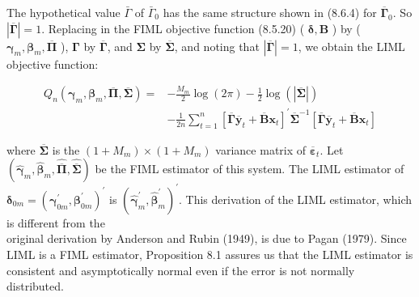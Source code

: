 \documentclass[10pt]{article}
\begin{document}
The hypothetical value $\bar{\Gamma}$ of $\bar{\Gamma}_{0}$ has the same structure shown in (8.6.4) for $\overline{\boldsymbol{\Gamma}}_{0}$. So $|\overline{\boldsymbol{\Gamma}}|=1$. Replacing in the FIML objective function (8.5.20) ( $\boldsymbol{\delta}, \mathbf{B}$ ) by ( $\boldsymbol{\gamma}_{m}, \boldsymbol{\beta}_{m}, \overline{\boldsymbol{\Pi}}$ ), $\boldsymbol{\Gamma}$ by $\overline{\boldsymbol{\Gamma}}$, and $\boldsymbol{\Sigma}$ by $\overline{\boldsymbol{\Sigma}}$, and noting that $|\overline{\boldsymbol{\Gamma}}|=1$, we obtain the LIML objective function:


\begin{align*}
Q_{n}\left(\boldsymbol{\gamma}_{m}, \boldsymbol{\beta}_{m}, \overline{\boldsymbol{\Pi}}, \overline{\boldsymbol{\Sigma}}\right)= & -\frac{M_{m}}{2} \log (2 \pi)-\frac{1}{2} \log (|\overline{\boldsymbol{\Sigma}}|) \\
& -\frac{1}{2 n} \sum_{t=1}^{n}\left[\overline{\boldsymbol{\Gamma}} \overline{\mathbf{y}}_{t}+\overline{\mathbf{B}} \mathbf{x}_{t}\right]^{\prime} \overline{\boldsymbol{\Sigma}}^{-1}\left[\overline{\boldsymbol{\Gamma}} \overline{\mathbf{y}}_{t}+\overline{\mathbf{B}} \mathbf{x}_{t}\right] \tag{8.6.6}
\end{align*}


where $\overline{\boldsymbol{\Sigma}}$ is the $\left(1+M_{m}\right) \times\left(1+M_{m}\right)$ variance matrix of $\overline{\boldsymbol{\varepsilon}}_{t}$. Let $\left(\hat{\boldsymbol{\gamma}}_{m}, \widehat{\boldsymbol{\beta}}_{m}, \widehat{\overline{\boldsymbol{\Pi}}}, \widehat{\overline{\boldsymbol{\Sigma}}}\right)$ be the FIML estimator of this system. The LIML estimator of $\boldsymbol{\delta}_{0 m}=\left(\boldsymbol{\gamma}_{0 m}^{\prime}, \boldsymbol{\beta}_{0 m}^{\prime}\right)^{\prime}$ is $\left(\hat{\boldsymbol{\gamma}}_{m}^{\prime}, \widehat{\boldsymbol{\beta}}_{m}^{\prime}\right)^{\prime}$. This derivation of the LIML estimator, which is different from the\\
original derivation by Anderson and Rubin (1949), is due to Pagan (1979). Since LIML is a FIML estimator, Proposition 8.1 assures us that the LIML estimator is consistent and asymptotically normal even if the error is not normally distributed.
\end{document}
